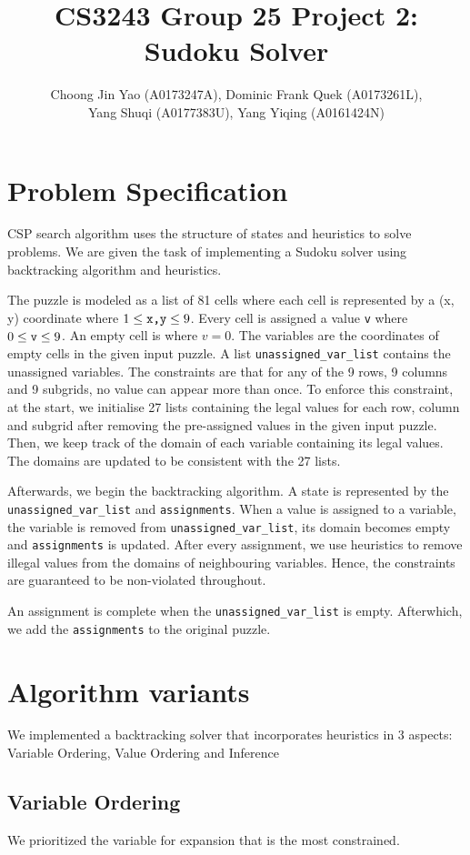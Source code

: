 \documentclass[runningheads]{llncs}
\title{CS3243 Group 25 Project 2: Sudoku Solver}
\author{Choong Jin Yao (A0173247A), Dominic Frank Quek (A0173261L),\\ Yang Shuqi (A0177383U), Yang Yiqing (A0161424N)}
\institute{National University of Singapore}
\begin{document}
\maketitle

\section{Problem Specification}
CSP search algorithm uses the structure of states and heuristics to solve problems. We are given the task of implementing a Sudoku solver using backtracking algorithm and heuristics. 

The puzzle is modeled as a list of 81 cells where each cell is represented by a (x, y) coordinate where $ 1\leq \verb`x,y` \leq 9$. Every cell is assigned a value \verb`v` where  $ 0\leq \verb`v` \leq 9$. An empty cell is where $v = 0$. The variables are the coordinates of empty cells in the given input puzzle. A list \verb`unassigned_var_list` contains the unassigned variables. The constraints are that for any of the 9 rows, 9 columns and 9 subgrids, no value can appear more than once. To enforce this constraint, at the start, we initialise 27 lists containing the legal values for each row, column and subgrid after removing the pre-assigned values in the given input puzzle. Then, we keep track of the domain of each variable containing its legal values. The domains are updated to be consistent with the 27 lists. 

Afterwards, we begin the backtracking algorithm. A state is represented by the \verb`unassigned_var_list` and \verb`assignments`. When a value is assigned to a variable, the variable is removed from \verb`unassigned_var_list`, its domain becomes empty and \verb`assignments` is updated. After every assignment, we use heuristics to remove illegal values from the domains of neighbouring variables. Hence, the constraints are guaranteed to be non-violated throughout.

An assignment is complete when the  \verb`unassigned_var_list` is empty. Afterwhich, we add the \verb`assignments` to the original puzzle.

\section{Algorithm variants}
We implemented a backtracking solver that incorporates heuristics in 3 aspects: Variable Ordering, Value Ordering and Inference

\subsection{Variable Ordering}
We prioritized the variable for expansion that is the most constrained.
\end{document}
